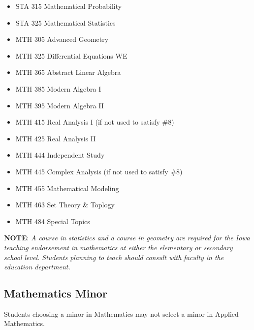 \documentclass[
  letterpaper,
]{scrbook}
\providecommand{\tightlist}{%
  \setlength{\itemsep}{0pt}\setlength{\parskip}{0pt}}
\begin{document}
\begin{enumerate}
  \begin{itemize}
  \tightlist
  \item
    STA 315 Mathematical Probability\\
  \item
    STA 325 Mathematical Statistics\\
  \item
    MTH 305 Advanced Geometry\\
  \item
    MTH 325 Differential Equations WE\\
  \item
    MTH 365 Abstract Linear Algebra\\
  \item
    MTH 385 Modern Algebra I\\
  \item
    MTH 395 Modern Algebra II\\
  \item
    MTH 415 Real Analysis I (if not used to satisfy \#8)\\
  \item
    MTH 425 Real Analysis II\\
  \item
    MTH 444 Independent Study\\
  \item
    MTH 445 Complex Analysis (if not used to satisfy \#8)\\
  \item
    MTH 455 Mathematical Modeling\\
  \item
    MTH 463 Set Theory \& Toplogy\\
  \item
    MTH 484 Special Topics
  \end{itemize}
\end{enumerate}

\textbf{NOTE}: \emph{A course in statistics and a course in geometry are
required for the Iowa teaching endorsement in mathematics at either the
elementary or secondary school level. Students planning to teach should
consult with faculty in the education department.}

\subsection{Mathematics Minor}\label{mathematics-minor}

Students choosing a minor in Mathematics may not select a minor in
Applied Mathematics.
\end{document}
